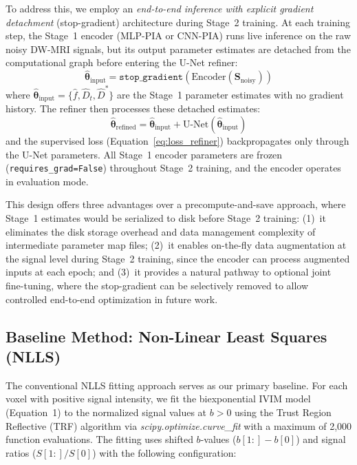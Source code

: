 \documentclass[12pt]{article}
\begin{document}
To address this, we employ an \emph{end-to-end inference with explicit gradient detachment} (stop-gradient) architecture during Stage~2 training. At each training step, the Stage~1 encoder (MLP-PIA or CNN-PIA) runs live inference on the raw noisy DW-MRI signals, but its output parameter estimates are detached from the computational graph before entering the U-Net refiner:
\begin{equation}
\hat{\boldsymbol{\theta}}_{\text{input}} = \texttt{stop\_gradient}\!\left(\text{Encoder}(\mathbf{S}_{\text{noisy}})\right)
\label{eq:stop_gradient}
\end{equation}
where $\hat{\boldsymbol{\theta}}_{\text{input}} = \{\hat{f}, \hat{D}_t, \hat{D}^*\}$ are the Stage~1 parameter estimates with no gradient history. The refiner then processes these detached estimates:
\begin{equation}
\hat{\boldsymbol{\theta}}_{\text{refined}} = \hat{\boldsymbol{\theta}}_{\text{input}} + \text{U-Net}(\hat{\boldsymbol{\theta}}_{\text{input}})
\end{equation}
and the supervised loss (Equation~\ref{eq:loss_refiner}) backpropagates only through the U-Net parameters. All Stage~1 encoder parameters are frozen (\texttt{requires\_grad=False}) throughout Stage~2 training, and the encoder operates in evaluation mode.

This design offers three advantages over a precompute-and-save approach, where Stage~1 estimates would be serialized to disk before Stage~2 training: (1)~it eliminates the disk storage overhead and data management complexity of intermediate parameter map files; (2)~it enables on-the-fly data augmentation at the signal level during Stage~2 training, since the encoder can process augmented inputs at each epoch; and (3)~it provides a natural pathway to optional joint fine-tuning, where the stop-gradient can be selectively removed to allow controlled end-to-end optimization in future work.


\subsection{Baseline Method: Non-Linear Least Squares (NLLS)}

The conventional NLLS fitting approach serves as our primary baseline. For each voxel with positive signal intensity, we fit the biexponential IVIM model (Equation~1) to the normalized signal values at $b > 0$ using the Trust Region Reflective (TRF) algorithm via \textit{scipy.optimize.curve\_fit} with a maximum of 2,000 function evaluations. The fitting uses shifted $b$-values ($b[1{:}] - b[0]$) and signal ratios ($S[1{:}] / S[0]$) with the following configuration:
\end{document}
